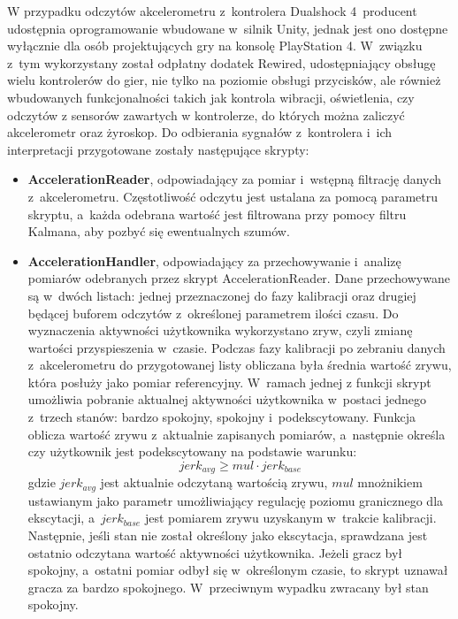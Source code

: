 W przypadku odczytów akcelerometru z~kontrolera Dualshock 4~producent udostępnia oprogramowanie wbudowane w~silnik Unity, jednak jest ono dostępne wyłącznie dla osób projektujących gry na konsolę PlayStation 4. W~związku z~tym wykorzystany został odpłatny dodatek Rewired, udostępniający obsługę wielu kontrolerów do gier, nie tylko na poziomie obsługi przycisków, ale również wbudowanych funkcjonalności takich jak kontrola wibracji, oświetlenia, czy odczytów z sensorów zawartych w kontrolerze, do których można zaliczyć akcelerometr oraz żyroskop. Do odbierania sygnałów z~kontrolera i~ich interpretacji przygotowane zostały następujące skrypty:
\begin{itemize}
	\item \textbf{AccelerationReader}, odpowiadający za pomiar i~wstępną filtrację danych z~akcelerometru. Częstotliwość odczytu jest ustalana za pomocą parametru skryptu, a~każda odebrana wartość jest filtrowana przy pomocy filtru Kalmana, aby pozbyć się ewentualnych szumów.
	\item \textbf{AccelerationHandler}, odpowiadający za przechowywanie i~analizę pomiarów odebranych przez skrypt AccelerationReader. Dane przechowywane są w~dwóch listach: jednej przeznaczonej do fazy kalibracji oraz drugiej będącej buforem odczytów z~określonej parametrem ilości czasu. Do wyznaczenia aktywności użytkownika wykorzystano zryw, czyli zmianę wartości przyspieszenia w~czasie. Podczas fazy kalibracji po zebraniu danych z~akcelerometru do przygotowanej listy obliczana była średnia wartość zrywu, która posłuży jako pomiar referencyjny. W~ramach jednej z funkcji skrypt umożliwia pobranie aktualnej aktywności użytkownika w~postaci jednego z~trzech stanów: bardzo spokojny, spokojny i~podekscytowany. Funkcja oblicza wartość zrywu z~aktualnie zapisanych pomiarów, a~następnie określa czy użytkownik jest podekscytowany na podstawie warunku:
	$$
	jerk_{avg} \geq mul \cdot jerk_{base}
	$$
	gdzie $jerk_{avg}$ jest aktualnie odczytaną wartością zrywu, $mul$ mnożnikiem ustawianym jako parametr umożliwiający regulację poziomu granicznego dla ekscytacji, a~$jerk_{base}$ jest pomiarem zrywu uzyskanym w~trakcie kalibracji. Następnie, jeśli stan nie został określony jako ekscytacja, sprawdzana jest ostatnio odczytana wartość aktywności użytkownika. Jeżeli gracz był spokojny, a~ostatni pomiar odbył się w~określonym czasie, to skrypt uznawał gracza za bardzo spokojnego. W~przeciwnym wypadku zwracany był stan spokojny.
\end{itemize}


